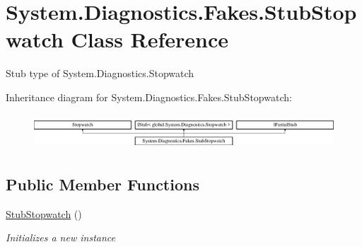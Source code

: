 \hypertarget{class_system_1_1_diagnostics_1_1_fakes_1_1_stub_stopwatch}{\section{System.\-Diagnostics.\-Fakes.\-Stub\-Stopwatch Class Reference}
\label{class_system_1_1_diagnostics_1_1_fakes_1_1_stub_stopwatch}
}


Stub type of System.\-Diagnostics.\-Stopwatch 


Inheritance diagram for System.\-Diagnostics.\-Fakes.\-Stub\-Stopwatch\-:\begin{figure}[H]
\begin{center}
\leavevmode
\includegraphics[height=1.328588cm]{class_system_1_1_diagnostics_1_1_fakes_1_1_stub_stopwatch}
\end{center}
\end{figure}
\subsection*{Public Member Functions}
\begin{DoxyCompactItemize}
\item 
\hyperlink{class_system_1_1_diagnostics_1_1_fakes_1_1_stub_stopwatch_a22cefea3b60d0cafd4b576591ccbb482}{Stub\-Stopwatch} ()
\begin{DoxyCompactList}\small\item\em Initializes a new instance\end{DoxyCompactList}\end{DoxyCompactItemize}
